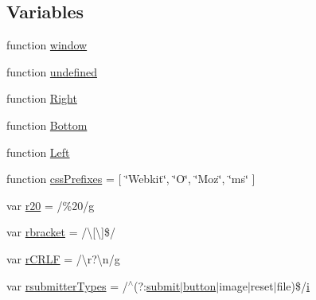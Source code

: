 \subsection*{Variables}
\begin{DoxyCompactItemize}
\item 
function \hyperlink{packages_2j_query_81_810_82_2_content_2_scripts_2jquery-1_810_82_8js_a04a8a2bbfa9c15500892b8e5033d625b}{window}
\item 
function \hyperlink{packages_2j_query_81_810_82_2_content_2_scripts_2jquery-1_810_82_8js_a08113a236cc18d2a9d5ce27e638012be}{undefined}
\item 
function \hyperlink{packages_2j_query_81_810_82_2_content_2_scripts_2jquery-1_810_82_8js_ac7f66efc33d974809d85fc5bdb00c6eb}{Right}
\item 
function \hyperlink{packages_2j_query_81_810_82_2_content_2_scripts_2jquery-1_810_82_8js_aff76c1cba4a00c678dfce0e0c5a5538a}{Bottom}
\item 
function \hyperlink{packages_2j_query_81_810_82_2_content_2_scripts_2jquery-1_810_82_8js_abef68bf244a1159a49fe3a2c153a65d2}{Left}
\item 
function \hyperlink{packages_2j_query_81_810_82_2_content_2_scripts_2jquery-1_810_82_8js_a2ed3892172b336458b8074254f4471da}{css\+Prefixes} = \mbox{[} \char`\"{}Webkit\char`\"{}, \char`\"{}O\char`\"{}, \char`\"{}Moz\char`\"{}, \char`\"{}ms\char`\"{} \mbox{]}
\item 
var \hyperlink{packages_2j_query_81_810_82_2_content_2_scripts_2jquery-1_810_82_8js_a0e39f72d512af99fb5992d66f1a1c821}{r20} = /\%20/\hyperlink{packages_2_respond_81_82_80_2content_2_scripts_2respond_8min_8js_a103df269476e78897c9c4c6cb8f4eb06}{g}
\item 
var \hyperlink{packages_2j_query_81_810_82_2_content_2_scripts_2jquery-1_810_82_8js_a07117e28ee58d2d2664cfbaf741e10c1}{rbracket} = /\textbackslash{}\mbox{[}\textbackslash{}\mbox{]}\$/
\item 
var \hyperlink{packages_2j_query_81_810_82_2_content_2_scripts_2jquery-1_810_82_8js_a4fd9dfc4eb645b441a3e84730c50154b}{r\+C\+R\+L\+F} = /\textbackslash{}r?\textbackslash{}n/\hyperlink{packages_2_respond_81_82_80_2content_2_scripts_2respond_8min_8js_a103df269476e78897c9c4c6cb8f4eb06}{g}
\item 
var \hyperlink{packages_2j_query_81_810_82_2_content_2_scripts_2jquery-1_810_82_8js_a0e9cd4ca08945afe827846f34a36c74a}{rsubmitter\+Types} = /$^\wedge$(?\+:\hyperlink{jquery-1_810_82-vsdoc_8js_a58af54f4f7137a051db7e3e27bdfe1b5}{submit}$\vert$\hyperlink{packages_2bootstrap_83_80_80_2content_2_scripts_2bootstrap_8min_8js_a55e170814e74f6c3db8ae9ea3ba9054f}{button}$\vert$image$\vert$reset$\vert$file)\$/\hyperlink{packages_2_respond_81_82_80_2content_2_scripts_2respond_8min_8js_a5e25b1d1bed9ab5f3174b76d6a722180}{i}

\end{DoxyCompactItemize}

